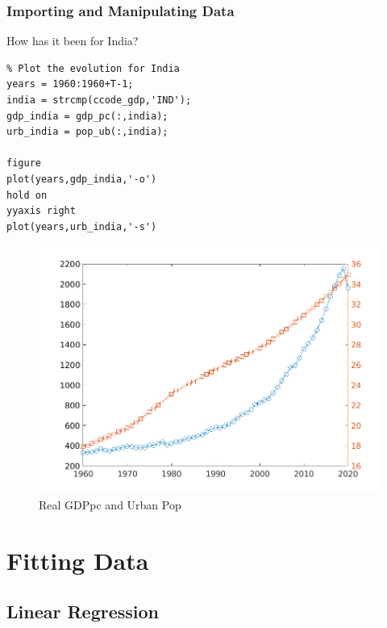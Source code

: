 \documentclass[11pt,xcolor={svgnames},aspectratio=169,usepdftitle=false]{beamer}
\begin{document}
\begin{frame}[fragile]
  \frametitle{Importing and Manipulating Data}
How has it been for India?

\begin{minipage}{0.45\textwidth}
\begin{lstlisting}
% Plot the evolution for India
years = 1960:1960+T-1;
india = strcmp(ccode_gdp,'IND');
gdp_india = gdp_pc(:,india);
urb_india = pop_ub(:,india);
  
figure
plot(years,gdp_india,'-o')
hold on
yyaxis right
plot(years,urb_india,'-s')
\end{lstlisting}
\end{minipage}
\begin{minipage}{0.45\textwidth}
\begin{figure}
  \centering
  \includegraphics[width = \textwidth]{../figures/india_gdp_urb.png}
  \caption{Real GDPpc and Urban Pop}
  \label{fig:india_evolution}
\end{figure}
\end{minipage}
\end{frame}

\section{Fitting Data}

\subsection{Linear Regression}
\end{document}
